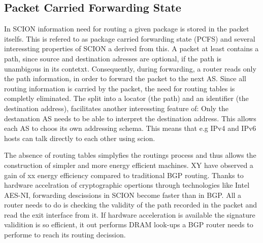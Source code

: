 \documentclass[../eva1_scion.tex]{subfiles}
\begin{document}
    \subsection{Packet Carried Forwarding State}
    In SCION information need for routing a given package is stored in the packet itselfs. This is refered to as package carried forwarding state (PCFS) and several interessting properties of SCION a derived from this. A packet at least contains a path, since source and destination adresses are optional, if the path is unambigous in its contetxt. Consequently, during forwarding, a router reads only the path information, in order to forward the packet to the next AS. Since all routing information is carried by the packet, the need for routing tables is completly eliminated. The split into a locator (the path) and an identifier (the destination address), facilitates another interessting feature of: Only the destanation AS needs to be able to interpret the destination address. This allows each AS to choos its own addressing schema. This means that e.g IPv4 and IPv6 hosts can talk directly to each other using scion.

    The absence of routing tables simplyfies the routings process and thus allows the construction of simpler and more energy efficient machines. XY have observed a gain of xx  energy efficiency compared to traditional BGP routing. Thanks to hardware accelration of cryptographic opertions through technologies like Intel AES-NI, forwarding descissions in SCION become faster than in BGP. All a router needs to do is checking the validity of the path recorded in the packet and read the exit interface from it. If hardware acceleration is available the signature validition is so efficient, it out performs DRAM look-ups a BGP router needs to performe to reach its routing decission. 
\end{document}
